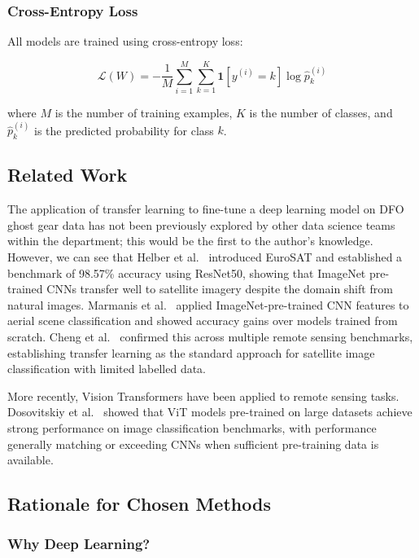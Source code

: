 \documentclass[12pt, letterpaper]{article}
\begin{document}
\subsubsection{Cross-Entropy Loss}

All models are trained using cross-entropy loss:

\begin{equation}
    \mathcal{L}(W) = -\frac{1}{M} \sum_{i=1}^{M} \sum_{k=1}^{K}
    \mathbf{1}[y^{(i)} = k] \log \hat{p}_k^{(i)}
    \label{eq:ce}
\end{equation}

where $M$ is the number of training examples, $K$ is the number of classes, and
$\hat{p}_k^{(i)}$ is the predicted probability for class $k$.

\subsection{Related Work}

The application of transfer learning to fine-tune a deep learning model on DFO ghost gear data has not been previously explored by other data science teams within the department; this would be the first to the author's knowledge. However, we can see that Helber et al.\ \cite{helber2019eurosat} introduced EuroSAT and established a benchmark of 98.57\% accuracy using ResNet50, showing that ImageNet pre-trained CNNs transfer well to satellite imagery despite the domain shift from natural images. 
Marmanis et al.\ \cite{marmanis2016deep} applied ImageNet-pre-trained CNN features to aerial scene classification and showed accuracy gains over models trained from scratch. Cheng et al.\ \cite{cheng2017remote} confirmed this across multiple remote sensing benchmarks, establishing transfer learning as the standard approach for satellite image classification with limited labelled data.

More recently, Vision Transformers have been applied to remote sensing tasks.
Dosovitskiy et al.\ \cite{dosovitskiy2021vit} showed that ViT models pre-trained on large datasets achieve strong performance on image classification benchmarks, with performance generally matching or exceeding CNNs when sufficient pre-training data is available. 

\subsection{Rationale for Chosen Methods}

\subsubsection{Why Deep Learning?}
\end{document}
